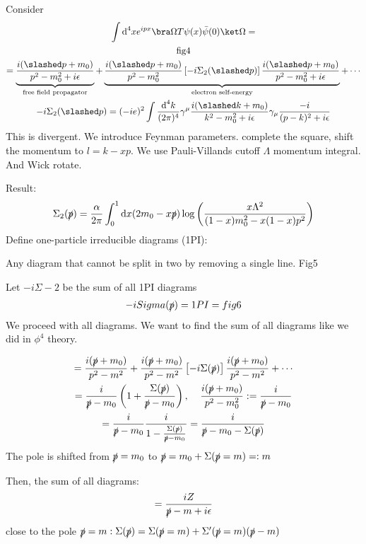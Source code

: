 \documentclass[]{scrartcl}
\begin{document}
Consider
\begin{gather}
\int \text d^4 x e^{ipx}\bra\Omega T\psi(x)\bar\psi(0)\ket\Omega=\\
\text{fig4}\\
= \underbrace{\frac{i(\slashed p + m_0)}{p^2 - m_0^2 + i\epsilon}}_{\text{free field propagator}} + \underbrace{\frac{i(\slashed p + m_0)}{p^2 - m_0^2}\left[-i\Sigma_2 (\slashed p)\right] \frac{i(\slashed p + m_0)}{p^2 - m_0^2 + i\epsilon}}_{\text{electron self-energy}} + \cdots\\
-i\Sigma_2(\slashed p) = (-ie)^2 \int \frac{\text d^4k}{(2\pi)^4} \gamma^\mu \frac{i(\slashed k+m_0)}{k^2 - m_0^2 + i\epsilon}\gamma_\mu \frac{-i}{(p-k)^2 + i\epsilon}
\end{gather}
This is divergent. We introduce Feynman parameters. complete the square, shift the momentum to $l = k-xp$. We use Pauli-Villands cutoff $\Lambda$ momentum integral. And Wick rotate.

Result:
\begin{gather}
	\Sigma_2(\slashed p) = \frac{\alpha}{2\pi}\int_0^1 \text dx (2m_0 - x\slashed p) \log\left( \frac{x\Lambda^2}{(1-x)m_0^2 - x(1-x)p^2}\right)
\end{gather}
Define one-particle irreducible diagrams (1PI):

Any diagram that cannot be split in two by removing a single line. Fig5

Let $-i\Sigma-2$ be the sum of all 1PI diagrams
\begin{gather}
	-iSigma(\slashed p) = 1PI = fig6
\end{gather}
We proceed with all diagrams. We want to find the sum of all diagrams like we did in $\phi^4$ theory.

\begin{gather}
	= \frac{i(\slashed p + m_0)}{p^2 - m^2} + \frac{i(\slashed p +m_0)}{p^2-m^2}\left[-i\Sigma(\slashed p)\right]\frac{i(\slashed p + m_0)}{p^2-m^2} + \cdots\\
	= \frac{i}{\slashed p - m_0}\left(1 + \frac{\Sigma(\slashed p)}{\slashed p - m_0}\right), \;\;\;\; \frac{i(\slashed p + m_0)}{p^2-m_0^2} := \frac{i}{\slashed p - m_0}\\
	= \frac{i}{\slashed p - m_0} \frac{i}{1 - \frac{\Sigma(\slashed p)}{\slashed p - m_0}} = \frac{i}{\slashed p - m_0 - \Sigma(\slashed p)}
\end{gather}
The pole is shifted from $\slashed p = m_0$ to $\slashed p = m_0 + \Sigma(\slashed p = m) =: m$

Then, the sum of all diagrams:
\begin{gather}
	= \frac{iZ}{\slashed p - m + i\epsilon}
\end{gather}
close to the pole $\slashed p = m : \Sigma(\slashed p) = \Sigma(\slashed p = m)+\Sigma'(\slashed p = m)(\slashed p - m)$
\end{document}

